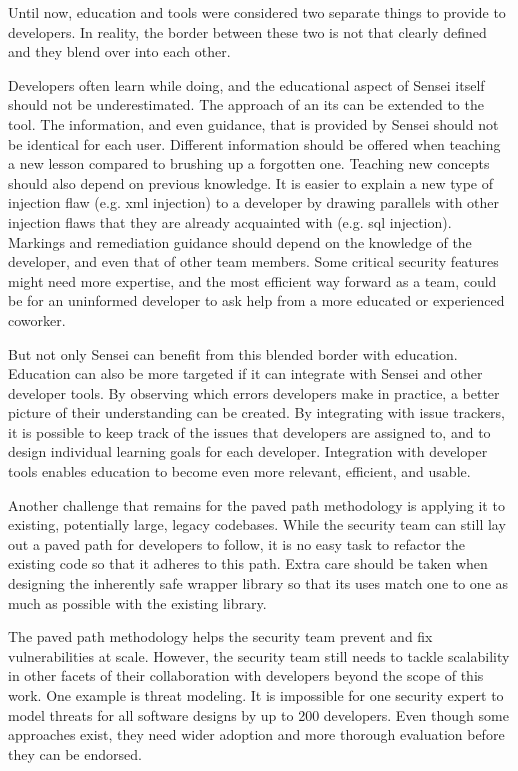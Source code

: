 Until now, education and tools were considered two separate things to provide to developers.
In reality, the border between these two is not that clearly defined and they blend over into each other. 


Developers often learn while doing, and the educational aspect of Sensei itself should not be underestimated. The approach of an \gls{its} can be extended to the tool. The information, and even guidance, that is provided by Sensei should not be identical for each user. Different information should be offered when teaching a new lesson compared to brushing up a forgotten one. Teaching new concepts should also depend on previous knowledge. It is easier to explain a new type of injection flaw (e.g. \gls{xml} injection) to a developer by drawing parallels with other injection flaws that they are already acquainted with (e.g. \gls{sql} injection).
Markings and remediation guidance should depend on the knowledge of the developer, and even that of other team members. Some critical security features might need more expertise, and the most efficient way forward as a team, could be for an uninformed developer to ask help from a more educated or experienced coworker.

But not only Sensei can benefit from this blended border with education.
Education can also be more targeted if it can integrate with Sensei and other developer tools. By observing which errors developers make in practice, a better picture of their understanding can be created.
By integrating with issue trackers, it is possible to keep track of the issues that developers are assigned to, and to design individual learning goals for each developer.
Integration with developer tools enables education to become even more relevant, efficient, and usable.

Another challenge that remains for the paved path methodology is applying it to existing, potentially large, legacy codebases. While the security team can still lay out a paved path for developers to follow, it is no easy task to refactor the existing code so that it adheres to this path. 
Extra care should be taken when designing the inherently safe wrapper library so that its uses match one to one as much as possible with the existing library. 

The paved path methodology helps the security team prevent and fix vulnerabilities at scale.
However, the security team still needs to tackle scalability in other facets of their collaboration with developers beyond the scope of this work.
One example is threat modeling.
It is impossible for one security expert to model threats for all software designs by up to 200 developers. 
Even though some approaches exist, they need wider adoption and more thorough evaluation before they can be endorsed.

